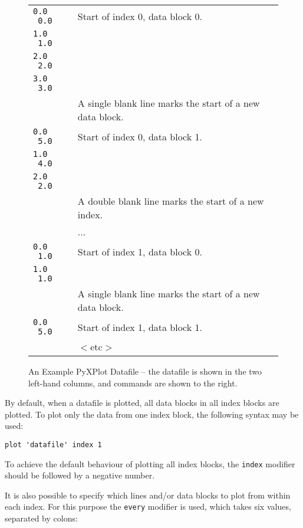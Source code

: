 \documentclass[a4paper,onecolumn,11pt]{book}
\begin{document}
\begin{figure}
\begin{tabular}{p{2.2cm}l}
\hline
\texttt{0.0 \ 0.0} & Start of index 0, data block 0. \\
\texttt{1.0 \ 1.0} & \\
\texttt{2.0 \ 2.0} & \\
\texttt{3.0 \ 3.0} & \\
                   & A single blank line marks the start of a new data block. \\
\texttt{0.0 \ 5.0} & Start of index 0, data block 1. \\
\texttt{1.0 \ 4.0} & \\
\texttt{2.0 \ 2.0} & \\
                   & A double blank line marks the start of a new index. \\
                   & ... \\
\texttt{0.0 \ 1.0} & Start of index 1, data block 0. \\
\texttt{1.0 \ 1.0} & \\
                   & A single blank line marks the start of a new data block. \\
\texttt{0.0 \ 5.0} & Start of index 1, data block 1. \\
                   & $<$etc$>$ \\
\hline
\end{tabular}
\caption{An Example PyXPlot Datafile -- the datafile is shown in the two left-hand columns, and commands are shown to the right.}
\label{sample_datafile}
\end{figure}

By default, when a datafile is plotted, all data blocks in all index blocks are
plotted. To plot only the data from one index block, the following syntax may
be used:

\begin{verbatim}
plot 'datafile' index 1
\end{verbatim}

\noindent To achieve the default behaviour of plotting all index blocks, the
\texttt{index} modifier should be followed by a negative number.

It is also possible to specify which lines and/or data blocks to plot from
within each index. For this purpose the \texttt{every} modifier is used, which
takes six values, separated by colons:
\end{document}
